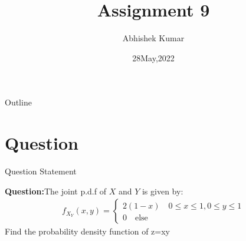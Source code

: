 \documentclass{beamer}
\title{Assignment 9}
\author{Abhishek Kumar}
\institute{IIT Hyderabad}
\date{28May,2022}
\begin{document}
	\begin{frame}
		\titlepage
	\end{frame}
	\begin{frame}{Outline}
		\tableofcontents
	\end{frame}
	\section{Question}
	\begin{frame}{Question Statement}
		
		\textbf{Question:}The joint p.d.f of $X$ and $Y$ is given by:  
		\begin{align}
			f_X_Y(x,y) = \left\{ \begin{array}{ll} 2(1-x) \quad 0 \leq x \leq 1,0 \leq y \leq 1 \\ 0 \quad \text{else} \end{array} \right. 
		\end{align}
		Find the probability density function of z=xy
	\end{frame}
\end{document}
